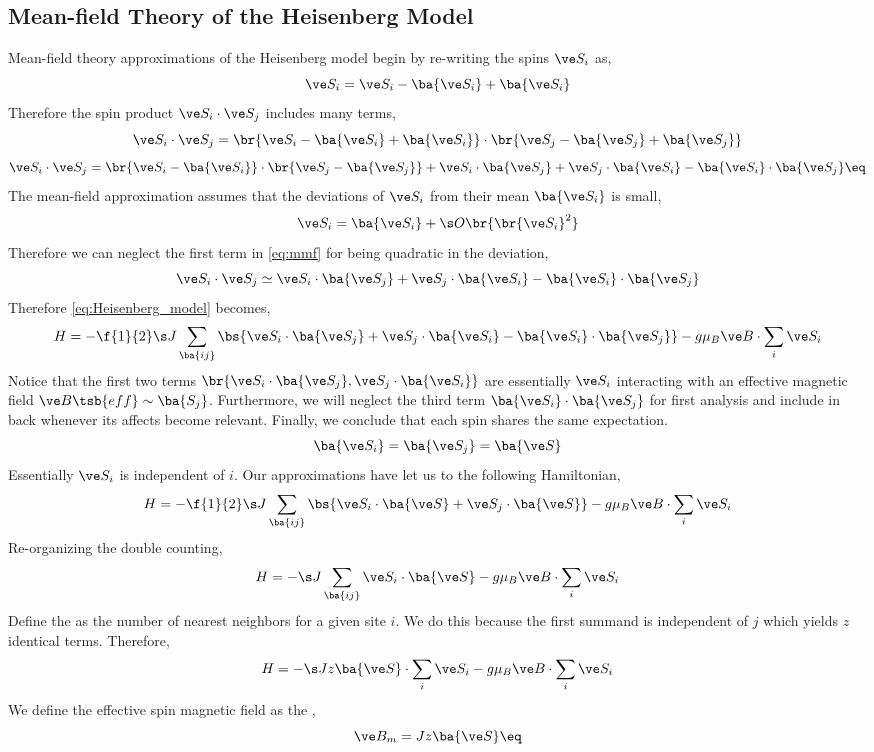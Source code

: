 \documentclass{article}
\begin{document}
\subsection{Mean-field Theory of the Heisenberg Model}
Mean-field theory approximations of the Heisenberg model begin by re-writing the spins $\ve S_i$ as,
\[ \ve S_i = \ve S_i - \ba{\ve S_i} + \ba{\ve S_i} \]
Therefore the spin product $\ve S_i \cdot \ve S_j$ includes many terms,
\[ \ve S_i \cdot \ve S_j = \br{\ve S_i - \ba{\ve S_i} + \ba{\ve S_i}} \cdot \br{\ve S_j - \ba{\ve S_j} + \ba{\ve S_j}} \]
\[ \ve S_i \cdot \ve S_j = \br{\ve S_i - \ba{\ve S_i}} \cdot \br{\ve S_j - \ba{\ve S_j}} + \ve S_i \cdot \ba{\ve S_j} + \ve S_j \cdot \ba{\ve S_i} - \ba{\ve S_i} \cdot \ba{\ve S_j} \eq \label{eq:mmf}\]
The mean-field approximation assumes that the deviations of $\ve S_i$ from their mean $\ba{\ve S_i}$ is small,
\[ \ve S_i = \ba{\ve S_i} + \s O\br{ \br{\ve S_i}^2} \]
Therefore we can neglect the first term in \cref{eq:mmf} for being quadratic in the deviation,
\[ \ve S_i \cdot \ve S_j \simeq \ve S_i \cdot \ba{\ve S_j} + \ve S_j \cdot \ba{\ve S_i} - \ba{\ve S_i} \cdot \ba{\ve S_j} \]
Therefore \cref{eq:Heisenberg_model} becomes,
\[ H = -\f{1}{2} \s J \sum_{\ba{ij}} \bs{\ve S_i \cdot \ba{\ve S_j} + \ve S_j \cdot \ba{\ve S_i} - \ba{\ve S_i} \cdot \ba{\ve S_j}} - g \mu_{B} \ve B \cdot \sum_{i} \ve S_i \]
Notice that the first two terms $\br{\ve S_i \cdot \ba{\ve S_j}, \ve S_j \cdot \ba{\ve S_i}}$ are essentially $\ve S_i$ interacting with an effective magnetic field $\ve B\tsb{eff} \sim \ba{S_j}$. Furthermore, we will neglect the third term $\ba{\ve S_i} \cdot \ba{\ve S_j}$ for first analysis and include in back whenever its affects become relevant. Finally, we conclude that each spin shares the same expectation.
\[ \ba{\ve S_i} = \ba{\ve S_j} = \ba{\ve S} \]
Essentially $\ve S_i$ is independent of $i$. Our approximations have let us to the following Hamiltonian,
\[ H = -\f{1}{2} \s J \sum_{\ba{ij}} \bs{\ve S_i \cdot \ba{\ve S} + \ve S_j \cdot \ba{\ve S}} - g \mu_{B} \ve B \cdot \sum_{i} \ve S_i \]
Re-organizing the double counting,
\[ H = -\s J \sum_{\ba{ij}} \ve S_i \cdot \ba{\ve S} - g \mu_{B} \ve B \cdot \sum_{i} \ve S_i \]
Define the  as the number of nearest neighbors for a given site $i$. We do this because the first summand is independent of $j$ which yields $z$ identical terms. Therefore,
\[ H = -\s J z \ba{\ve S} \cdot \sum_{i} \ve S_i  - g \mu_{B} \ve B \cdot \sum_{i} \ve S_i \]
We define the effective spin magnetic field as the ,
\[ \ve B_m = J z \ba{\ve S} \eq \label{eq:Bm_Defined}\]
\end{document}
